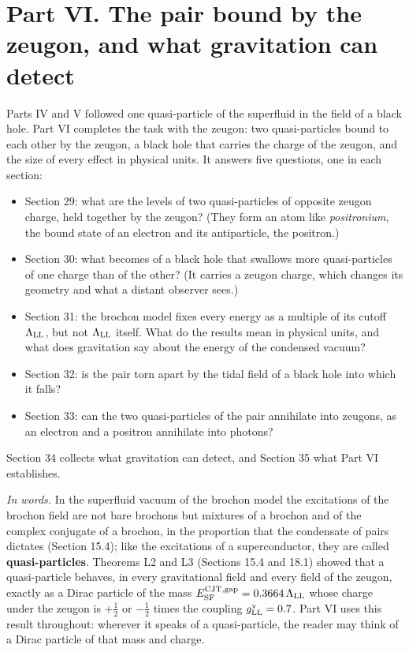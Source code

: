 \documentclass[
  10pt,
]{article}
\providecommand{\tightlist}{%
  \setlength{\itemsep}{0pt}\setlength{\parskip}{0pt}}
\begin{document}
\hypertarget{part-vi.-the-pair-bound-by-the-zeugon-and-what-gravitation-can-detect}{%
\section{Part VI. The pair bound by the zeugon, and what gravitation can
detect}\label{part-vi.-the-pair-bound-by-the-zeugon-and-what-gravitation-can-detect}}

Parts IV and V followed one quasi-particle of the superfluid in the
field of a black hole. Part VI completes the task with the zeugon: two
quasi-particles bound to each other by the zeugon, a black hole that
carries the charge of the zeugon, and the size of every effect in
physical units. It answers five questions, one in each section:

\begin{itemize}
\tightlist
\item
  Section 29: what are the levels of two quasi-particles of opposite
  zeugon charge, held together by the zeugon? (They form an atom like
  \emph{positronium}, the bound state of an electron and its
  antiparticle, the positron.)
\item
  Section 30: what becomes of a black hole that swallows more
  quasi-particles of one charge than of the other? (It carries a zeugon
  charge, which changes its geometry and what a distant observer sees.)
\item
  Section 31: the brochon model fixes every energy as a multiple of its
  cutoff \(\Lambda_{\rm LL}\), but not \(\Lambda_{\rm LL}\) itself. What
  do the results mean in physical units, and what does gravitation say
  about the energy of the condensed vacuum?
\item
  Section 32: is the pair torn apart by the tidal field of a black hole
  into which it falls?
\item
  Section 33: can the two quasi-particles of the pair annihilate into
  zeugons, as an electron and a positron annihilate into photons?
\end{itemize}

Section 34 collects what gravitation can detect, and Section 35 what
Part VI establishes.

\emph{In words.} In the superfluid vacuum of the brochon model the
excitations of the brochon field are not bare brochons but mixtures of a
brochon and of the complex conjugate of a brochon, in the proportion
that the condensate of pairs dictates (Section 15.4); like the
excitations of a superconductor, they are called
\textbf{quasi-particles}. Theorems L2 and L3 (Sections 15.4 and 18.1)
showed that a quasi-particle behaves, in every gravitational field and
every field of the zeugon, exactly as a Dirac particle of the mass
\(E^{\rm CJT,gap}_{\rm SF}=0.3664\,\Lambda_{\rm LL}\) whose charge under
the zeugon is \(+\tfrac12\) or \(-\tfrac12\) times the coupling
\(g^{\rm v}_{\rm LL}=0.7\). Part VI uses this result throughout:
wherever it speaks of a quasi-particle, the reader may think of a Dirac
particle of that mass and charge.
\end{document}
